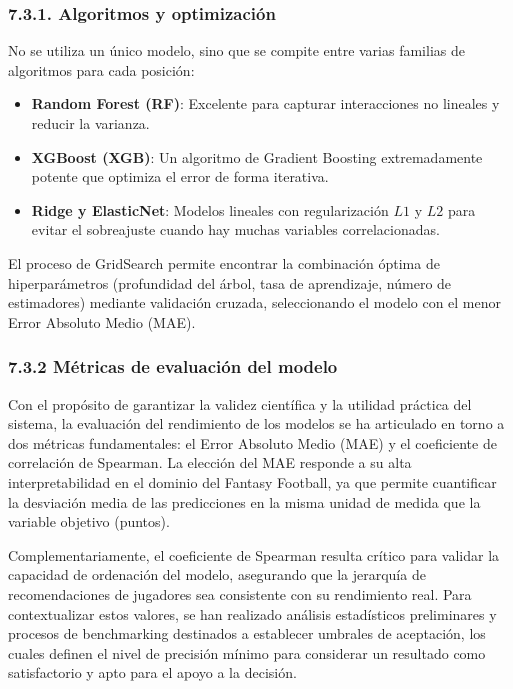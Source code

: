 \subsubsection{7.3.1. Algoritmos y optimización}
No se utiliza un único modelo, sino que se compite entre varias familias de
algoritmos para cada posición:

\begin{itemize}
\item \textbf{Random Forest (RF)}: Excelente para capturar interacciones no
lineales y reducir la varianza.
\item \textbf{XGBoost (XGB)}: Un algoritmo de Gradient Boosting extremadamente
potente que optimiza el error de forma iterativa.
\item \textbf{Ridge y ElasticNet}: Modelos lineales con regularización $L1$ y
$L2$ para evitar el sobreajuste cuando hay muchas variables
correlacionadas.
\end{itemize}
El proceso de GridSearch permite encontrar la combinación óptima de
hiperparámetros (profundidad del árbol, tasa de aprendizaje, número de
estimadores) mediante validación cruzada, seleccionando el modelo con el menor
Error Absoluto Medio (MAE).

\subsubsection{7.3.2 Métricas de evaluación del modelo}
Con el propósito de garantizar la validez científica y la utilidad práctica del
sistema, la evaluación del rendimiento de los modelos se ha articulado en torno
a dos métricas fundamentales: el Error Absoluto Medio (MAE) y el coeficiente de
correlación de Spearman. La elección del MAE responde a su alta
interpretabilidad en el dominio del Fantasy Football, ya que permite cuantificar
la desviación media de las predicciones en la misma unidad de medida que la
variable objetivo (puntos).

Complementariamente, el coeficiente de Spearman resulta crítico para validar la
capacidad de ordenación del modelo, asegurando que la jerarquía de
recomendaciones de jugadores sea consistente con su rendimiento real. Para
contextualizar estos valores, se han realizado análisis estadísticos
preliminares y procesos de benchmarking destinados a establecer umbrales de
aceptación, los cuales definen el nivel de precisión mínimo para considerar un
resultado como satisfactorio y apto para el apoyo a la decisión.


